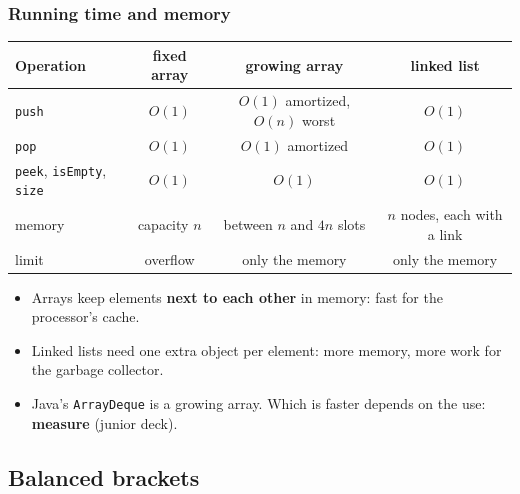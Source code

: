 \documentclass[aspectratio=169,10pt,compress]{beamer}
\begin{document}
\begin{frame}[t,fragile] \frametitle{Running time and memory}
  \begin{center}\small
  \begin{tabular}{lccc}
    \toprule
    \textbf{Operation} & \textbf{fixed array} & \textbf{growing array} & \textbf{linked list} \\
    \midrule
    \texttt{push}      & $O(1)$               & $O(1)$ amortized, $O(n)$ worst & $O(1)$ \\
    \texttt{pop}       & $O(1)$               & $O(1)$ amortized               & $O(1)$ \\
    \texttt{peek}, \texttt{isEmpty}, \texttt{size} & $O(1)$ & $O(1)$          & $O(1)$ \\
    memory             & capacity $n$         & between $n$ and $4n$ slots     & $n$ nodes, each with a link \\
    limit              & overflow             & only the memory               & only the memory \\
    \bottomrule
  \end{tabular}
  \end{center}
  \vspace{0.4em}
  \begin{itemize}\small
    \item Arrays keep elements \textbf{next to each other} in memory: fast for the processor's cache.
    \item Linked lists need one extra object per element: more memory, more work for the garbage collector.
    \item Java's \texttt{ArrayDeque} is a growing array. Which is faster depends on the use: \textbf{measure} (junior deck).
  \end{itemize}
\end{frame}


\subsection[Brackets]{Balanced brackets}
\end{document}
